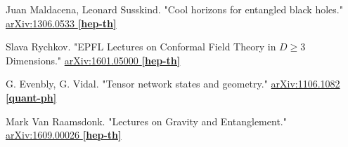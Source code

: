 \documentclass[10pt]{amsart}
\begin{document}
\begin{thebibliography}{9}
Juan Maldacena, Leonard Susskind.  "Cool horizons for entangled black holes."  \href{https://arxiv.org/abs/1306.0533}{ 	arXiv:1306.0533 \textbf{[hep-th]}}

Slava Rychkov.  "EPFL Lectures on Conformal Field Theory in $D \geq 3$ Dimensions."    \href{https://arxiv.org/abs/1601.05000}{arXiv:1601.05000 \textbf{[hep-th]}}

G. Evenbly, G. Vidal.  "Tensor network states and geometry."  \href{https://arxiv.org/abs/1106.1082}{arXiv:1106.1082 \textbf{[quant-ph]}}

Mark Van Raamsdonk.  "Lectures on Gravity and Entanglement."  \href{https://arxiv.org/abs/1609.00026}{arXiv:1609.00026 \textbf{[hep-th]}}

\end{thebibliography}
\end{document}
